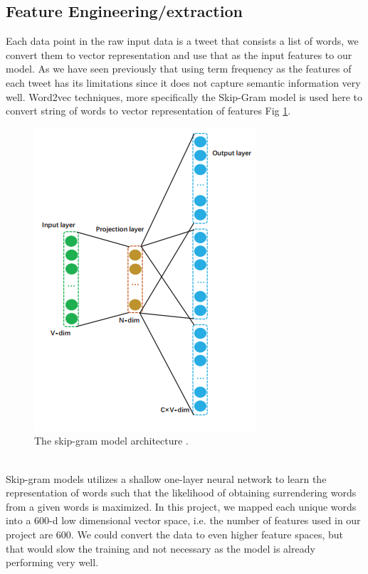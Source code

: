 \documentclass[journal, a4paper]{IEEEtran}
\begin{document}
\subsection{Feature Engineering/extraction}
Each data point in the raw input data is a tweet that consists a list of words, we convert them to vector representation and use that as the input features to our model. As we have seen previously that using term frequency as the features of each tweet has its limitations since it does not capture semantic information very well. Word2vec techniques, more specifically the Skip-Gram model is used here to convert string of words to vector representation of features Fig \ref{fig:2}.
\begin{figure}[!hbt]
	\centering
	\includegraphics[width=0.8\columnwidth]{word2vec.png}
	\caption{ The skip-gram model architecture \cite{Li-lstm}.}
	\label{fig:2}
\end{figure}\\
Skip-gram models utilizes a shallow one-layer neural network to learn the representation of words such that the likelihood of obtaining surrendering words from a given words is maximized. In this project, we mapped each unique words into a 600-d low dimensional vector space, i.e. the number of features used in our project are 600. We could convert the data to even higher feature spaces, but that would slow the training and not necessary as the model is already performing very well.
\end{document}
